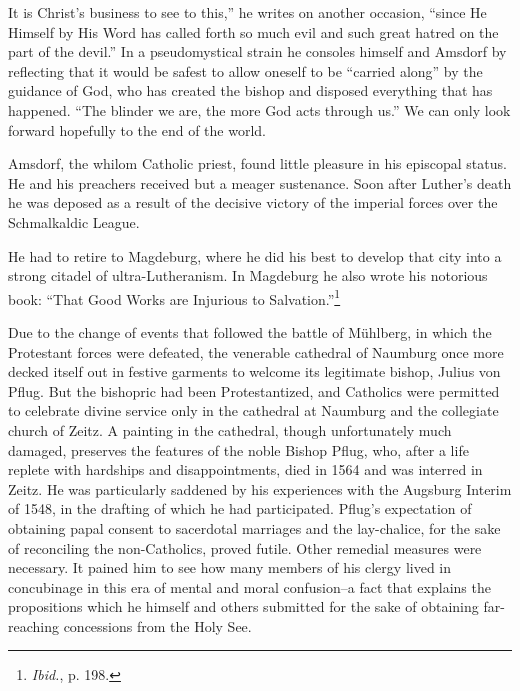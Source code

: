 It is Christ’s business to see to this,” he writes on another occasion, “since
He Himself by His Word has called forth so much evil and such great
hatred on the part of the devil.” In a pseudomystical strain he consoles
himself and Amsdorf by reflecting that it would be safest to allow oneself to be
“carried along” by the guidance of God, who has created the bishop and
disposed everything that has happened. “The blinder we are, the more God
acts through us.” We can only look forward hopefully to the end of the
world.

Amsdorf, the whilom Catholic priest, found little pleasure in his
episcopal status. He and his preachers received but a meager sustenance.
Soon after Luther’s death he was deposed as a result of the decisive victory
of the imperial forces over the Schmalkaldic League.

He had to retire to Magdeburg, where he did his best to develop that
city into a strong citadel of ultra-Lutheranism. In Magdeburg he also
wrote his notorious book: “That Good Works are Injurious to Salvation.”\footnote{\textit{Ibid.}, p. 198.}

Due to the change of events that followed the battle of Mühlberg,
in which the Protestant forces were defeated, the venerable cathedral
of Naumburg once more decked itself out in festive garments to welcome
its legitimate bishop, Julius von Pflug. But the bishopric had
been Protestantized, and Catholics were permitted to celebrate divine
service only in the cathedral at Naumburg and the collegiate church
of Zeitz. A painting in the cathedral, though unfortunately much
damaged, preserves the features of the noble Bishop Pflug, who, after
a life replete with hardships and disappointments, died in 1564 and
was interred in Zeitz. He was particularly saddened by his experiences
with the Augsburg Interim of 1548, in the drafting of which he had
participated. Pflug’s expectation of obtaining papal consent to sacerdotal
marriages and the lay-chalice, for the sake of reconciling the
non-Catholics, proved futile. Other remedial measures were necessary.
It pained him to see how many members of his clergy lived in
concubinage in this era of mental and moral confusion--a fact that
explains the propositions which he himself and others submitted
for the sake of obtaining far-reaching concessions from the Holy
See.

